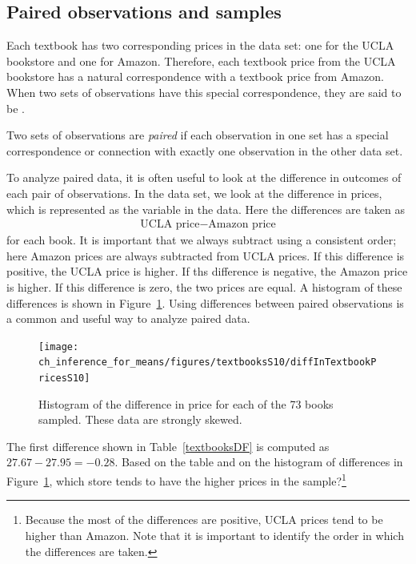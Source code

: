 \subsection{Paired observations and samples}

Each textbook has two corresponding prices in the data set: one for the UCLA bookstore and one for Amazon. Therefore, each textbook price from the UCLA bookstore has a natural correspondence with a textbook price from Amazon. When two sets of observations have this special correspondence, they are said to be .

\begin{termBox}{
Two sets of observations are \emph{paired} if each observation in one set has a special correspondence or connection with exactly one observation in the other data set.}
\end{termBox}

To analyze paired data, it is often useful to look at the difference in outcomes of each pair of observations. In the  data set, we look at the difference in prices, which is represented as the  variable in the  data. Here the differences are taken as
\begin{eqnarray*}
\text{UCLA price} - \text{Amazon price}
\end{eqnarray*}
for each book. It is important that we always subtract using a consistent order; here Amazon prices are always subtracted from UCLA prices. If this difference is positive, the UCLA price is higher. If ths difference is negative, the Amazon price is higher. If this difference is zero, the two prices are equal. A histogram of these differences is shown in Figure~\ref{diffInTextbookPricesS10}. Using differences between paired observations is a common and useful way to analyze paired data.

\begin{figure}
\centering
\texttt{[image: ch\_inference\_for\_means/figures/textbooksS10/diffInTextbookPricesS10]}
\caption{Histogram of the difference in price for each of the 73 books sampled. These data are strongly skewed.}
\label{diffInTextbookPricesS10}
\end{figure}

\begin{exercise}
The first difference shown in Table~\ref{textbooksDF} is computed as $27.67-27.95=-0.28$. Based on the table and on the histogram of differences in Figure~\ref{diffInTextbookPricesS10}, which store tends to have the higher prices in the sample?\footnote{Because the most of the differences are positive, UCLA prices tend to be higher than Amazon. Note that it is important to identify the order in which the differences are taken.}
\end{exercise}


